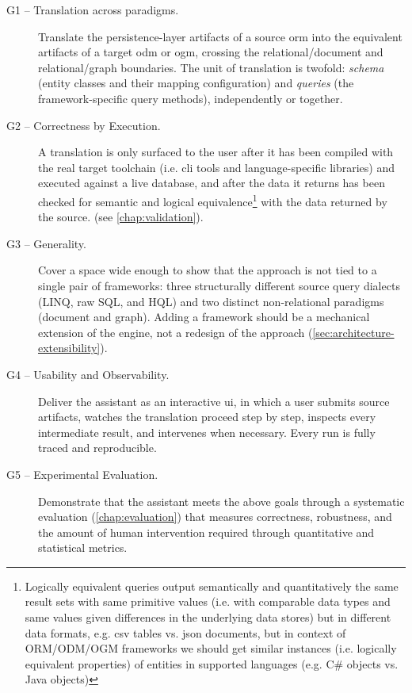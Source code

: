 \begin{description}
  \item[G1 -- Translation across paradigms.] Translate the persistence-layer artifacts of a source \acrshort{orm} into the equivalent artifacts of a target \acrshort{odm} or \acrshort{ogm}, crossing the relational/document and relational/graph boundaries. The unit of translation is twofold: \emph{schema} (entity classes and their mapping configuration) and \emph{queries} (the framework-specific query methods), independently or together.

  \item[G2 -- Correctness by Execution.] A translation is only surfaced to the user after it has been compiled with the real target toolchain (i.e. \Acrfull{cli} tools and language-specific libraries) and executed against a live database, and after the data it returns has been checked for semantic and logical equivalence\footnote{Logically equivalent queries output semantically and quantitatively the same result sets with same primitive values (i.e. with comparable data types and same values given differences in the underlying data stores) but in different data formats, e.g. \acrshort{csv} tables vs. \acrshort{json} documents, but in context of ORM/ODM/OGM frameworks we should get similar instances (i.e. logically equivalent properties) of entities in supported languages (e.g. C\# objects vs. Java objects)} with the data returned by the source. (see \cref{chap:validation}).~\cite{execoder2025}

  \item[G3 -- Generality.] Cover a space wide enough to show that the approach is not tied to a single pair of frameworks: three structurally different source query dialects (LINQ, raw SQL, and HQL) and two distinct non-relational paradigms (document and graph). Adding a framework should be a mechanical extension of the engine, not a redesign of the approach (\cref{sec:architecture-extensibility}).

  \item[G4 -- Usability and Observability.] Deliver the assistant as an interactive \Acrfull{ui}, in which a user submits source artifacts, watches the translation proceed step by step, inspects every intermediate result, and intervenes when necessary. Every run is fully traced and reproducible.
  
  \item[G5 -- Experimental Evaluation.] Demonstrate that the assistant meets the above goals through a systematic evaluation (\cref{chap:evaluation}) that measures correctness, robustness, and the amount of human intervention required through quantitative and statistical metrics.


\end{description}

